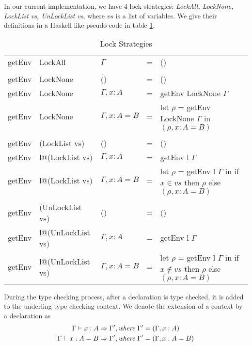 \documentclass{article}
\theoremstyle{remark}
\begin{document}
In our current implementation, we have 4 lock strategies: \emph{LockAll, LockNone, LockList vs, UnLockList vs}, where $vs$ is a list of variables. We give their definitions in a Haskell like pseudo-code in table \ref{tab:lock}.
\begin{table}[h] 
  \centering
  \begin{tabular}{l l l l p{5cm}}
    getEnv & LockAll  & $\Gamma$ & = & () \\
    \\ 
    getEnv & LockNone & () & = & ()        \\
    getEnv & LockNone & $\Gamma, x : A$ & = & getEnv LockNone $\Gamma$ \\ 
    getEnv & LockNone & $\Gamma, x : A = B$ & = & let $\rho$ = getEnv LockNone $\Gamma$ \newline in $(\rho, x : A = B)$ \\
    \\ 
    getEnv & (LockList vs) & () & = & ()        \\
    getEnv & l@(LockList vs) & $\Gamma, x : A$ & = & getEnv l $\Gamma$ \\ 
    getEnv & l@(LockList vs) & $\Gamma, x : A = B$ & = & let $\rho$ = getEnv l $\Gamma$ \newline in if $x \in vs$ then $\rho$ \newline else $(\rho, x : A = B)$\\
    \\
    getEnv & (UnLockList vs) & () & = & ()        \\
    getEnv & l@(UnLockList vs) & $\Gamma, x : A$ & = & getEnv l $\Gamma$ \\ 
    getEnv & l@(UnLockList vs) & $\Gamma, x : A = B$ & = & let $\rho$ = getEnv l $\Gamma$ \newline in if $x \notin vs$ then $\rho$ \newline else $(\rho, x : A = B)$
  \end{tabular}
  \caption{Lock Strategies}
  \label{tab:lock}
\end{table}

During the type checking process, after a declaration is type checked, it is added to the underling type checking context. We denote the extension of a context by a declaration as
\begin{align*}
  \Gamma \vdash x : A &\Rightarrow \Gamma', \text{\emph{where}} \; \Gamma' = (\Gamma, x : A) \\
  \Gamma \vdash x : A = B &\Rightarrow \Gamma', \text{\emph{where}} \; \Gamma' = (\Gamma, x : A = B)
\end{align*}
\end{document}
